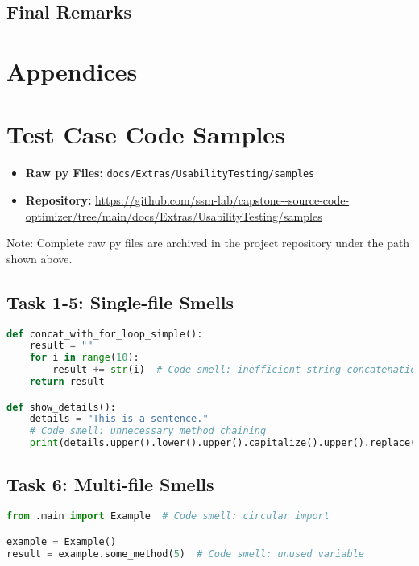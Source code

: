 \documentclass{article}
\begin{document}
\subsection{Final Remarks}

\newpage
\section*{Appendices}

\section{Test Case Code Samples}
\label{app:code}


\begin{itemize}
    \item \textbf{Raw py Files:} \texttt{docs/Extras/UsabilityTesting/samples}
    \item \textbf{Repository:} \url{https://github.com/ssm-lab/capstone--source-code-optimizer/tree/main/docs/Extras/UsabilityTesting/samples}
\end{itemize}

\noindent
\footnotesize{Note: Complete raw py files are archived in the project repository under the path shown above.}


\subsection{Task 1-5: Single-file Smells}
\begin{lstlisting}[language=Python,caption={String Manipulation Smells (sample.py)},label=lst:task15]
def concat_with_for_loop_simple():
    result = ""
    for i in range(10):
        result += str(i)  # Code smell: inefficient string concatenation
    return result

def show_details():
    details = "This is a sentence."
    # Code smell: unnecessary method chaining
    print(details.upper().lower().upper().capitalize().upper().replace("|", "-"))
\end{lstlisting}

\subsection{Task 6: Multi-file Smells}
\begin{lstlisting}[language=Python,caption={Extra1 File (extra1.py)},label=lst:task6a]
from .main import Example  # Code smell: circular import

example = Example()
result = example.some_method(5)  # Code smell: unused variable
\end{lstlisting}
\end{document}
